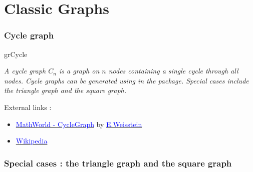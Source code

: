 \section{Classic Graphs}
\subsubsection{Cycle graph}
\begin{NewMacroBox}{grCycle}{}

\medskip
\emph{A cycle graph $C_n$ is a graph on $n$ nodes containing a single cycle through all nodes. Cycle graphs can be generated using  in   the  package. Special cases include  the triangle graph and  the square graph.}

\medskip
External links :

\medskip
\begin{itemize}

\item \href{http://mathworld.wolfram.com/CycleGraph.html}%
           {\textcolor{blue}{MathWorld - CycleGraph}} by %
      \href{http://en.wikipedia.org/wiki/Eric_W._Weisstein}%
           {\textcolor{blue}{E.Weisstein}}

\item  \href{http://en.wikipedia.org/wiki/Cycle_graph}%
            {\textcolor{blue}{Wikipedia}}

\end{itemize}
\end{NewMacroBox}

\subsubsection{Special cases : the triangle graph and  the square graph}


\begin{center}
\begin{tkzexample}[small]
\end{tkzexample}
\end{center}

\newpage
